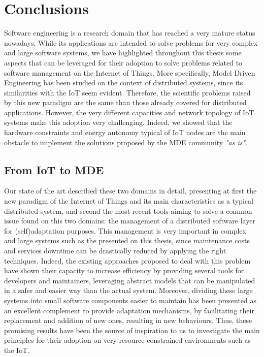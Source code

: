 \chapter{Conclusions}
\label{sec:Conclusions}
Software engineering is a research domain that has reached a very mature status nowadays.
While its applications are intended to solve problems for very complex and large software systems, we have highlighted throughout this thesis some aspects that can be leveraged for their adoption to solve problems related to software management on the Internet of Things.
More specifically, Model Driven Engineering has been studied on the context of distributed systems, since its similarities with the IoT seem evident.
Therefore, the scientific problems raised by this new paradigm are the same than those already covered for distributed applications.
However, the very different capacities and network topology of IoT systems make this adoption very challenging.
Indeed, we showed that the hardware constraints and energy autonomy typical of IoT nodes are the main obstacle to implement the solutions proposed by the MDE community \textit{"as is"}.

\section{From IoT to MDE}
Our state of the art described these two domains in detail, presenting at first the new paradigm of the Internet of Things and its main characteristics as a typical distributed system, and second the most recent tools aiming to solve a common issue found on this two domains: the management of a distributed software layer for (self)adaptation purposes.
This management is very important in complex and large systems such as the presented on this thesis, since maintenance costs and services downtime can be drastically reduced by applying the right techniques.
Indeed, the existing approaches proposed to deal with this problem have shown their capacity to increase efficiency by providing several tools for developers and maintainers, leveraging abstract models that can be manipulated in a safer and easier way than the actual system.
Moreover, dividing these large systems into small software components easier to maintain has been presented as an excellent complement to provide adaptation mechanisms, by facilitating their replacement and addition of new ones, resulting in new behaviours.
Thus, these promising results have been the source of inspiration to us to investigate the main principles for their adoption on very resource constrained environments such as the IoT.

